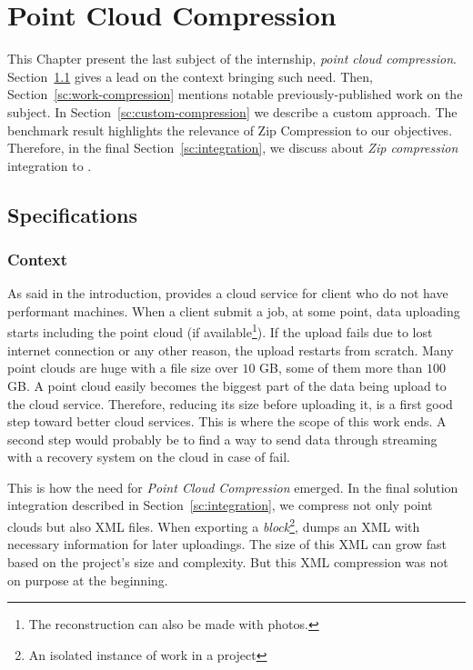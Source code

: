 \chapter{Point Cloud Compression}
\label{ch:compression}
This Chapter present the last subject of the internship, \emph{point cloud compression}. Section~\ref{sc:spec-compression} gives a lead on the context bringing such need. Then, Section~\ref{sc:work-compression} mentions notable previously-published work on the subject. In Section~\ref{sc:custom-compression} we describe a custom approach. The benchmark result highlights the relevance of Zip Compression to our objectives. Therefore, in the final Section~\ref{sc:integration}, we discuss about \emph{Zip compression} integration to \CC.

\section{Specifications}
\label{sc:spec-compression}

\subsection{Context}
As said in the introduction, \CC provides a cloud service for client who do not have performant machines. When a client submit a job, at some point, data uploading starts including the point cloud (if available\footnote{The reconstruction can also be made with photos.}). If the upload fails due to lost internet connection or any other reason, the upload restarts from scratch. Many point clouds are huge with a file size over $10$ GB, some of them more than $100$ GB. A point cloud easily becomes the biggest part of the data being upload to the cloud service. Therefore, reducing its size before uploading it, is a first good step toward better cloud services. This is where the scope of this work ends. A second step would probably be to find a way to send data through streaming with a recovery system on the cloud in case of fail.

This is how the need for \emph{Point Cloud Compression} emerged. In the final solution integration described in Section~\ref{sc:integration}, we compress not only point clouds but also XML files. When exporting a \emph{block}\footnote{An isolated instance of work in a \CC project}, \CC dumps an XML with necessary information for later uploadings. The size of this XML can grow fast based on the project's size and complexity. But this XML compression was not on purpose at the beginning.

